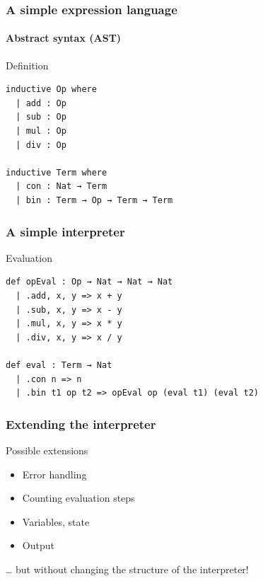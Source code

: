 \documentclass{beamer}
\subtitle{Interpreters and Monads}
\begin{document}
\begin{frame}
  \titlepage
\end{frame}



\begin{frame}[fragile]
  \frametitle{A simple expression language}
  \framesubtitle{Abstract syntax (AST)}
\begin{block}{Definition}
\begin{lstlisting}
inductive Op where
  | add : Op
  | sub : Op
  | mul : Op
  | div : Op

inductive Term where
  | con : Nat → Term
  | bin : Term → Op → Term → Term
\end{lstlisting}  
\end{block}
\end{frame}             

\begin{frame}[fragile]
  \frametitle{A simple interpreter}
\begin{block}{Evaluation}
\begin{lstlisting}
def opEval : Op → Nat → Nat → Nat
  | .add, x, y => x + y
  | .sub, x, y => x - y
  | .mul, x, y => x * y
  | .div, x, y => x / y

def eval : Term → Nat
  | .con n => n
  | .bin t1 op t2 => opEval op (eval t1) (eval t2)
\end{lstlisting}  
\end{block}
\end{frame}             

\begin{frame}[fragile]
  \frametitle{Extending the interpreter}
  \begin{block}{Possible extensions}
    \begin{itemize}
    \item Error handling
    \item Counting evaluation steps
    \item Variables, state
    \item Output
    \end{itemize}
    \dots{} but without changing the structure of the interpreter!
  \end{block}
\end{frame}
\end{document}
